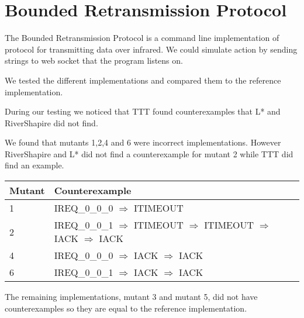 \documentclass[11pt,a4paper]{article}
\begin{document}
\section{Bounded Retransmission Protocol}

The Bounded Retransmission Protocol is a command line implementation
of protocol for transmitting data over infrared. We could simulate
action by sending strings to web socket that the program listens on.

We tested the different implementations and compared them to the
reference implementation.

During our testing we noticed that TTT found counterexamples that L* and
RiverShapire did not find.

We found that mutants 1,2,4 and 6 were incorrect implementations.
However RiverShapire and L* did not find a counterexample for mutant 2
while TTT did find an example.

\begin{center}
\begin{tabular}{l|l}
\textbf{Mutant} & \textbf{Counterexample}\\
\hline
1 & IREQ\_0\_0\_0 $\Rightarrow$ ITIMEOUT\\
2 & IREQ\_0\_0\_1 $\Rightarrow$ ITIMEOUT $\Rightarrow$ ITIMEOUT $\Rightarrow$ IACK $\Rightarrow$ IACK\\
4 & IREQ\_0\_0\_0 $\Rightarrow$ IACK $\Rightarrow$ IACK\\
6 & IREQ\_0\_0\_1 $\Rightarrow$ IACK $\Rightarrow$ IACK\\
\end{tabular}
\end{center}

The remaining implementations, mutant 3 and mutant 5, did not have
counterexamples so they are equal to the reference implementation.


\end{document}
